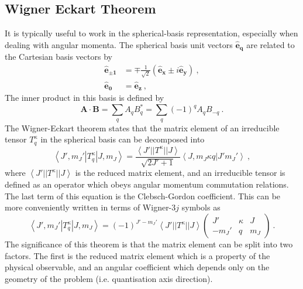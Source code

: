 \documentclass{article}
\begin{document}
\subsection{Wigner Eckart Theorem}
It is typically useful to work in the spherical-basis representation, especially when dealing with angular momenta. The spherical basis unit vectors $\boldsymbol{\hat{e}_{q}}$ are related to the Cartesian basis vectors by 
\begin{align}
    \boldsymbol{\hat{e}_{\pm{1}}} &= \mp \frac{1}{\sqrt{2}} \left(\boldsymbol{\hat{e}_x} \pm i\boldsymbol{\hat{e}_y}\right)~, \\
    \boldsymbol{\hat{e}_{0}} &= \boldsymbol{\hat{e}_z}~,
\end{align}
The inner product in this basis is defined by 
\begin{equation}
    \mathbf{A}\cdot\mathbf{B} = \sum_q A_qB^*_q =  \sum_q (-1)^qA_qB_{-q}~.
\end{equation}
The Wigner-Eckart theorem states that the matrix element of an irreducible tensor $T^{\kappa}_q$ in the spherical basis can be decomposed into 
\begin{equation}
    \left\langle J', m_J'|T^{\kappa}_q|J, m_J\right\rangle=\frac{\left\langle J'||T^{\kappa}||J\right\rangle}{\sqrt{2J'+1}}\left\langle J, m_J\kappa q|J'm_J'\right\rangle~,
\end{equation}
where $\left\langle J'||T^{\kappa}||J\right\rangle$ is the reduced matrix element, and an irreducible tensor is defined as an operator which obeys angular momentum commutation relations. The last term of this equation is the Clebsch-Gordon coefficient. This can be more conveniently written in terms of Wigner-$3j$ symbols as
\begin{equation}
\left\langle J', m_J'|T^{\kappa}_q|J, m_J\right\rangle= (-1)^{J'-m_J'}\left\langle J'||T^{\kappa}||J\right\rangle
\begin{pmatrix}
J' & \kappa & J\\
-m_J' & q & m_J
\end{pmatrix}~.
\end{equation}
The significance of this theorem is that the matrix element can be split into two factors. The first is the reduced matrix element which is a property of the physical observable, and an angular coefficient which depends only on the geometry of the problem (i.e. quantisation axis direction).
\end{document}
